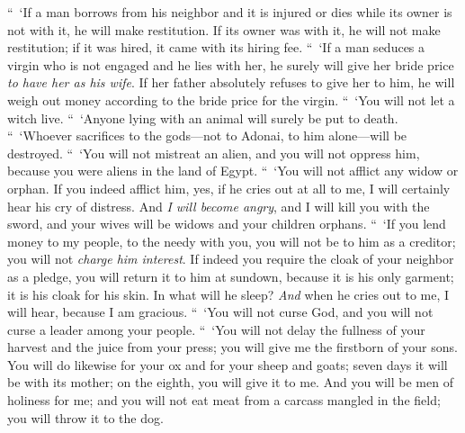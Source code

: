 \begin{biblechapter}
\verse “ ‘If a man borrows from his neighbor and it is injured or dies while its owner is not with it, he will make restitution.
\verse If its owner was with it, he will not make restitution; if it was hired, it came with its hiring fee.
 “ ‘If a man seduces a virgin who is not engaged and he lies with her, he surely will give her bride price \textit{to have her as his wife}.
\verse If her father absolutely refuses to give her to him, he will weigh out money according to the bride price for the virgin.
\verse “ ‘You will not let a witch live.
\verse “ ‘Anyone lying with an animal will surely be put to death.
\verse “ ‘Whoever sacrifices to the gods—not to Adonai, to him alone—will be destroyed.
 “ ‘You will not mistreat an alien, and you will not oppress him, because you were aliens in the land of Egypt.
\verse “ ‘You will not afflict any widow or orphan.
\verse If you indeed afflict him, yes, if he cries out at all to me, I will certainly hear his cry of distress.
\verse And \textit{I will become angry}, and I will kill you with the sword, and your wives will be widows and your children orphans.
\verse “ ‘If you lend money to my people, to the needy with you, you will not be to him as a creditor; you will not \textit{charge him interest}.
\verse If indeed you require the cloak of your neighbor as a pledge, you will return it to him at sundown,
\verse because it is his only garment; it is his cloak for his skin. In what will he sleep? \textit{And} when he cries out to me, I will hear, because I am gracious.
 “ ‘You will not curse God, and you will not curse a leader among your people.
\verse “ ‘You will not delay the fullness of your harvest and the juice from your press; you will give me the firstborn of your sons.
\verse You will do likewise for your ox and for your sheep and goats; seven days it will be with its mother; on the eighth, you will give it to me.
\verse And you will be men of holiness for me; and you will not eat meat from a carcass mangled in the field; you will throw it to the dog.
\end{biblechapter}

